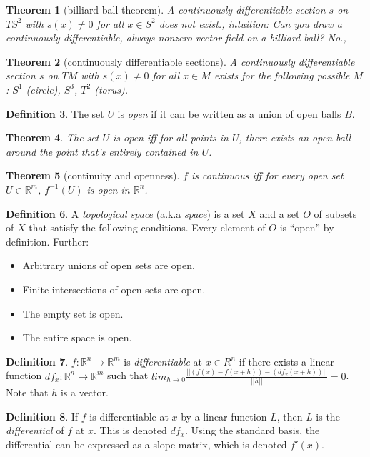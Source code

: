 \documentclass[11pt,leqno,oneside]{amsart}
\newcommand{\R}{{\mathbb R}} %
\newtheorem{thm}{Theorem}[section]
\theoremstyle{definition}
\newtheorem{defn}[thm]{Definition}
\numberwithin{equation}{section}
\begin{document}
\begin{thm}[billiard ball theorem]
	A continuously differentiable section $s$ on $TS^2$ with $s(x) \neq 0$ for all $x \in S^2$ does not exist.,
	intuition: Can you draw a continuously differentiable, always nonzero vector field on a billiard ball?  No.,
\end{thm}
\begin{thm}[continuously differentiable sections]
	A continuously differentiable section $s$ on $TM$ with $s(x) \neq 0$ for all $x \in M$ exists for the following possible $M$: $S^1$ (circle), $S^3$, $T^2$ (torus).
\end{thm}
\begin{defn}
	The set $U$ is \emph{open} if it can be written as a union of open balls $B$.
\end{defn}
\begin{thm}
	The set $U$ is open iff for all points in $U$, there exists an open ball around the point that's entirely contained in $U$.
\end{thm}
\begin{thm}[continuity and openness]
	$f$ is continuous iff for every open set $U \in \R^m$, $f^{-1}(U)$ is open in $\R^n$.
\end{thm}
\begin{defn}
	A \emph{topological space} (a.k.a \emph{space}) is a set $X$ and a set $O$ of subsets of $X$ that satisfy the following conditions.  Every element of $O$ is ``open'' by definition.  Further:
	\begin{itemize}
		\item Arbitrary unions of open sets are open.
		\item Finite intersections of open sets are open.
		\item The empty set is open.
		\item The entire space is open.
	\end{itemize}
\end{defn}
\begin{defn}
	$f :\R^n \to \R^m$ is \emph{differentiable} at $x \in R^n$ if there exists a linear function $df_x : \R^n \to \R^m$  such that $lim_{h \to 0} \frac{|| (f(x)-f(x+h)) - (df_x(x+h)) ||}{||h||} = 0$.  Note that $h$ is a vector.
\end{defn}
\begin{defn}
	If $f$ is differentiable at $x$ by a linear function $L$, then $L$ is the \emph{differential} of $f$ at $x$.  This is denoted $df_x$.  Using the standard basis, the differential can be expressed as a slope matrix, which is denoted $f'(x)$.
\end{defn}
\end{document}
